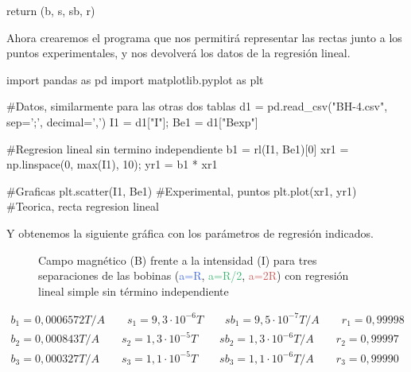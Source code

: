 \documentclass[12pt, a4paper, titlepage]{article}
\begin{document}
\begin{appendices}
\begin{python}
          return (b, s, sb, r)
    \end{python}

    Ahora crearemos el programa que nos permitirá representar las rectas junto a los puntos experimentales, y nos devolverá los datos de la regresión lineal.

    \begin{python}
      import pandas as pd
      import matplotlib.pyplot as plt

      #Datos, similarmente para las otras dos tablas
      d1 = pd.read_csv("BH-4.csv", sep=';', decimal=',')
      I1 = d1["I"]; Be1 = d1["Bexp"]

      #Regresion lineal sin termino independiente
      b1 = rl(I1, Be1)[0]
      xr1 = np.linspace(0, max(I1), 10); yr1 = b1 * xr1

      #Graficas
      plt.scatter(I1, Be1) #Experimental, puntos
      plt.plot(xr1, yr1) #Teorica, recta regresion lineal
    \end{python}

    Y obtenemos la siguiente gráfica con los parámetros de regresión indicados.

    \begin{figure}[H]
      \hspace{2.5em} 
      \caption{Campo magnético (B) frente a la intensidad (I) para tres separaciones de las bobinas (\textcolor{RoyalBlue}{a=R}, \textcolor{MediumSeaGreen}{a=R/2}, \textcolor{IndianRed}{a=2R}) con regresión lineal simple sin término independiente}
    \end{figure}
    \begin{gather*}
      b_1 = 0,0006572 T/A \qquad s_1 = 9,3 \cdot 10^{-6} T \qquad sb_1 = 9,5 \cdot 10^{-7} T/A \qquad r_1 = 0,99998 \\
      b_2 = 0,000843 T/A \qquad s_2 = 1,3 \cdot 10^{-5} T \qquad sb_2 = 1,3 \cdot 10^{-6} T/A \qquad r_2 = 0,99997 \\
      b_3 = 0,000327 T/A \qquad s_3 = 1,1 \cdot 10^{-5} T \qquad sb_3 = 1,1 \cdot 10^{-6} T/A \qquad r_3 = 0,99990
    \end{gather*}

  \end{appendices}
\end{document}

